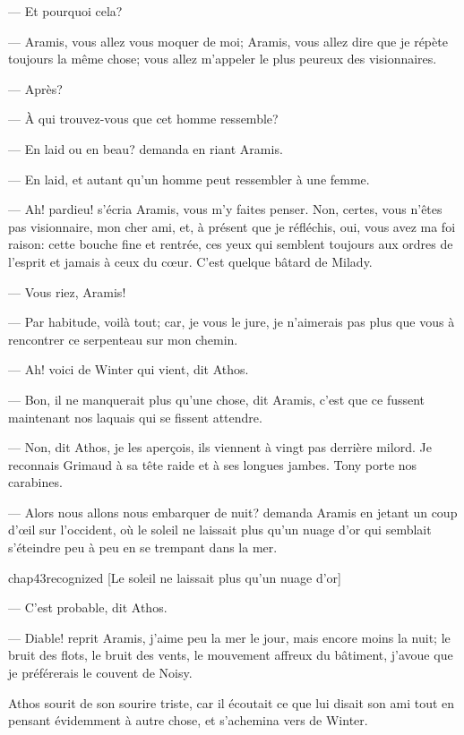 — Et pourquoi cela?

— Aramis, vous allez vous moquer de moi; Aramis, vous allez dire que je répète toujours la même chose; vous allez m'appeler le plus peureux des visionnaires.

— Après?

— À qui trouvez-vous que cet homme ressemble?

— En laid ou en beau? demanda en riant Aramis.

— En laid, et autant qu'un homme peut ressembler à une femme.

— Ah! pardieu! s'écria Aramis, vous m'y faites penser. Non, certes, vous n'êtes pas visionnaire, mon cher ami, et, à présent que je réfléchis, oui, vous avez ma foi raison: cette bouche fine et rentrée, ces yeux qui semblent toujours aux ordres de l'esprit et jamais à ceux du cœur. C'est quelque bâtard de Milady.

— Vous riez, Aramis!

— Par habitude, voilà tout; car, je vous le jure, je n'aimerais pas plus que vous à rencontrer ce serpenteau sur mon chemin.

— Ah! voici de Winter qui vient, dit Athos.

— Bon, il ne manquerait plus qu'une chose, dit Aramis, c'est que ce fussent maintenant nos laquais qui se fissent attendre.

— Non, dit Athos, je les aperçois, ils viennent à vingt pas derrière milord. Je reconnais Grimaud à sa tête raide et à ses longues jambes. Tony porte nos carabines.

— Alors nous allons nous embarquer de nuit? demanda Aramis en jetant un coup d'œil sur l'occident, où le soleil ne laissait plus qu'un nuage d'or qui semblait s'éteindre peu à peu en se trempant dans la mer.

\begin{bwbigpic}
	[\basicscale] 
	{chap43recognized}
	[Le soleil ne laissait plus qu'un nuage d'or]
\end{bwbigpic}

— C'est probable, dit Athos.

— Diable! reprit Aramis, j'aime peu la mer le jour, mais encore moins la nuit; le bruit des flots, le bruit des vents, le mouvement affreux du bâtiment, j'avoue que je préférerais le couvent de Noisy.

Athos sourit de son sourire triste, car il écoutait ce que lui disait son ami tout en pensant évidemment à autre chose, et s'achemina vers de Winter.

